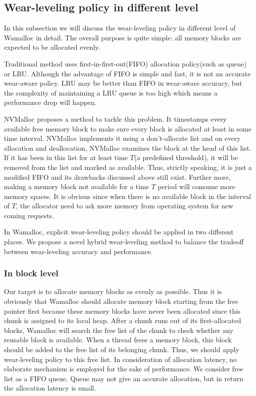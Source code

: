 \documentclass[10pt, conference, compsocconf]{IEEEtran}
\begin{document}
\subsection{Wear-leveling policy in different level}

In this subsection we will discuss the wear-leveling policy in different level of Wamalloc in detail.
The overall purpose is quite simple: all memory blocks are expected to be allocated evenly.

Traditional method uses first-in-first-out(FIFO) allocation policy(such as queue) or LRU\cite{zhou2009durable}\cite{rodriguez2015write}.
Although the advantage of FIFO is simple and fast, it is not an accurate wear-aware policy.
LRU may be better than FIFO in wear-aware accuracy, but the complexity of maintaining a LRU queue is too high which means a performance drop will happen.

NVMalloc\cite{moraru2013consistent} proposes a method to tackle this problem.
It timestamps every available free memory block to make sure every block is allocated at least in some time interval.
NVMalloc implements it using a don't-allocate list and on every allocation and deallocation,
NVMalloc examines the block at the head of this list.
If it has been in this list for at least time $T$(a predefined threshold), it will be removed from the list and marked as available.
Thus, strictly speaking, it is just a modified FIFO and its drawbacks discussed above still exist.
Further more, making a memory block not available for a time $T$ period will consume more memory spaces. 
It is obvious since when there is no available block in the interval of $T$, the allocator need to ask more memory from operating system for new coming requests.

In Wamalloc, explicit wear-leveling policy should be applied in two different places. 
We propose a novel hybrid wear-leveling method to balance the tradeoff between wear-leveling accuracy and performance.

\subsubsection{In block level}
Our target is to allocate memory blocks as evenly as possible.
Thus it is obviously that Wamalloc should allocate memory block starting from the free pointer first
because these memory blocks have never been allocated since this chunk is assigned to its local heap.
After a chunk runs out of its first-allocated blocks, Wamalloc will search the free list of the chunk to check whether any reusable block is available.
When a thread frees a memory block, this block should be added to the free list of its belonging chunk.
Thus, we should apply wear-leveling policy to this free list.
In consideration of allocation latency, no elaborate mechanism is employed for the sake of performance.
We consider free list as a FIFO queue. Queue may not give an accurate allocation, but in return the allocation latency is small.
\end{document}
